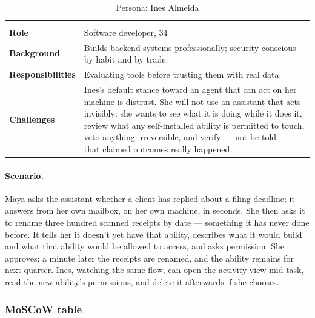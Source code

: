\documentclass[12pt]{article}
\begin{document}
\begin{table}[htbp]
  \centering
  \caption{Persona: Ines Almeida}
  \label{tab:persona-ines}
  \begin{tabularx}{\textwidth}{@{}>{\bfseries}p{3.4cm}X@{}}
    \toprule
    \multicolumn{2}{@{}l}{\textbf{Ines Almeida}} \\
    \midrule
    Role & Software developer, 34 \\
    Background & Builds backend systems professionally; security-conscious by
      habit and by trade. \\
    Responsibilities & Evaluating tools before trusting them with real data. \\
    Challenges & Ines's default stance toward an agent that can act on her
      machine is distrust. She will not use an assistant that acts invisibly:
      she wants to see what it is doing while it does it, review what any
      self-installed ability is permitted to touch, veto anything
      irreversible, and verify --- not be told --- that claimed outcomes
      really happened. \\
    \bottomrule
  \end{tabularx}
\end{table}

\paragraph{Scenario.} Maya asks the assistant whether a client has replied
about a filing deadline; it answers from her own mailbox, on her own machine,
in seconds. She then asks it to rename three hundred scanned receipts by date
--- something it has never done before. It tells her it doesn't yet have that
ability, describes what it would build and what that ability would be allowed
to access, and asks permission. She approves; a minute later the receipts are
renamed, and the ability remains for next quarter. Ines, watching the same
flow, can open the activity view mid-task, read the new ability's
permissions, and delete it afterwards if she chooses.

\subsubsection{MoSCoW table}\label{sec:moscow}
\end{document}
